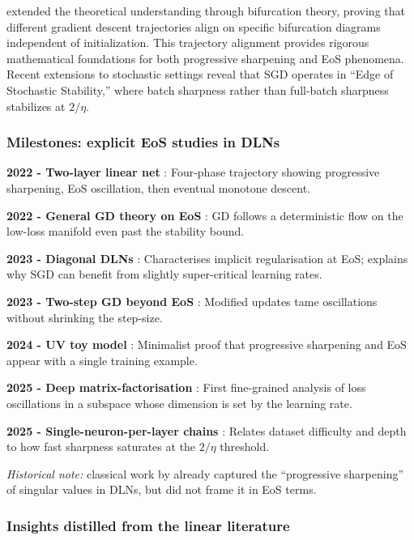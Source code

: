 \documentclass[11pt]{article}
\begin{document}
\citet{song2023trajectory} extended the theoretical understanding through bifurcation theory, proving that different gradient descent trajectories align on specific bifurcation diagrams independent of initialization. This trajectory alignment provides rigorous mathematical foundations for both progressive sharpening and EoS phenomena. Recent extensions to stochastic settings reveal that SGD operates in ``Edge of Stochastic Stability,'' where batch sharpness rather than full-batch sharpness stabilizes at $2/\eta$.

\subsubsection{Milestones: explicit EoS studies in DLNs}

\textbf{2022 - Two-layer linear net} \citep{Li2022SharpnessEoS}: Four-phase trajectory showing progressive sharpening, EoS oscillation, then eventual monotone descent.

\textbf{2022 - General GD theory on EoS} \citep{Arora2022Understanding}: GD follows a deterministic flow on the low-loss manifold even past the stability bound.

\textbf{2023 - Diagonal DLNs} \citep{Labarriere2024DiagonalDLN}: Characterises implicit regularisation at EoS; explains why SGD can benefit from slightly super-critical learning rates.

\textbf{2023 - Two-step GD beyond EoS} \citep{Chen2023TwoStep}: Modified updates tame oscillations without shrinking the step-size.

\textbf{2024 - UV toy model} \citep{Kalra2023Universal}: Minimalist proof that progressive sharpening and EoS appear with a single training example.

\textbf{2025 - Deep matrix-factorisation} \citep{Ghosh2025DeepMF}: First fine-grained analysis of loss oscillations in a subspace whose dimension is set by the learning rate.

\textbf{2025 - Single-neuron-per-layer chains} \citep{Yoo2025SingleNeuron}: Relates dataset difficulty and depth to how fast sharpness saturates at the $2/\eta$ threshold.

\vspace{0.5em}
\noindent
\emph{Historical note:} classical work by \citet{saxe2013exact} already
captured the ``progressive sharpening'' of singular values in DLNs, but
did not frame it in EoS terms.

\subsubsection{Insights distilled from the linear literature}
\end{document}
